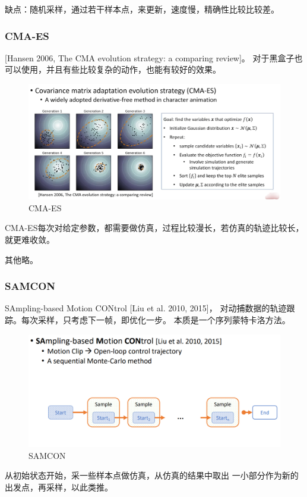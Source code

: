 \documentclass[lang=cn,newtx,10pt,scheme=chinese]{elegantbook}
\begin{document}
缺点：随机采样，通过若干样本点，来更新，速度慢，精确性比较比较差。

\subsubsection{CMA-ES}
[Hansen 2006, The CMA evolution strategy: a comparing review]。
对于黑盒子也可以使用，并且有些比较复杂的动作，也能有较好的效果。
\begin{figure}[htbp]
  \centering
  \includegraphics[totalheight=1.5in]{"./image/CMA-ES.png"}
  \caption{CMA-ES} \label{fig:CMA-ES}
\end{figure}
CMA-ES每次对给定参数，都需要做仿真，过程比较漫长，若仿真的轨迹比较长，
就更难收敛。

其他略。
\subsubsection{SAMCON}
SAmpling-based Motion CONtrol [Liu et al. 2010, 2015]，
对动捕数据的轨迹跟踪。每次采样，只考虑下一帧，即优化一步。
本质是一个序列蒙特卡洛方法。
\begin{figure}[htbp]
  \centering
  \includegraphics[totalheight=1.5in]{"./image/SAMCON.png"}
  \caption{SAMCON} \label{fig:SAMCON}
\end{figure}

从初始状态开始，采一些样本点做仿真，从仿真的结果中取出
一小部分作为新的出发点，再采样，以此类推。
\end{document}
